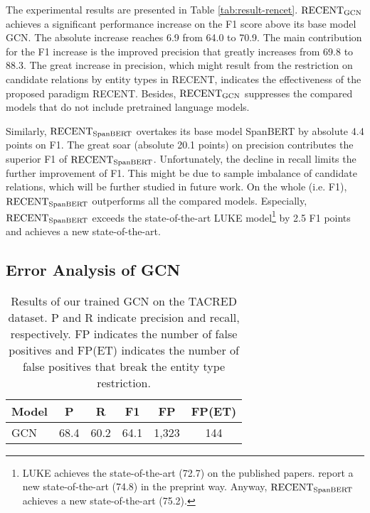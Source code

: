 \documentclass[11pt,a4paper]{article}
\begin{document}
The experimental results are presented in Table \ref{tab:result-rencet}. 
$\text{RECENT}_{\rm GCN}$ achieves a significant performance increase on the F1 score above its base model GCN. 
The absolute increase reaches  6.9 from 64.0 to 70.9. 
The main contribution for the F1 increase is the improved precision  that greatly increases from 69.8 to 88.3.
The great increase in precision, which might result from the restriction on candidate relations by entity types in RECENT, indicates the effectiveness of the proposed paradigm RECENT. 
Besides, $\text{RECENT}_{\rm GCN}$ suppresses the compared models that do not include pretrained language models. 

Similarly, $\text{RECENT}_{\rm SpanBERT}$ overtakes its base model SpanBERT by absolute 4.4 points on F1.
The great soar (absolute 20.1 points) on precision contributes the superior F1 of $\text{RECENT}_{\rm SpanBERT}$. 
Unfortunately, 
the decline in recall limits the further improvement of F1.  
This might be due to sample imbalance  of candidate relations, 
which will be further studied in future work. 
On the whole (i.e. F1), $\text{RECENT}_{\rm SpanBERT}$ outperforms all the compared models. 
Especially, $\text{RECENT}_{\rm SpanBERT}$ exceeds the state-of-the-art LUKE 
model\footnote{LUKE achieves the state-of-the-art (72.7) on the published papers. 
	\citet{cohen-etal-2020-relation} report a new state-of-the-art (74.8) in the preprint way. 
	Anyway, $\text{RECENT}_{\rm SpanBERT}$ achieves a new state-of-the-art (75.2). 
} 
by 2.5 F1 points 
and achieves a new state-of-the-art.

\subsection{Error Analysis of GCN}

\begin{table}[t]
	\centering

		\begin{tabular}{lccc|cc}		
			\toprule
			{Model} & {P} & {R} & {F1} & {FP} & {FP(ET)}   \\ 
			\midrule
			GCN  & 68.4 & 60.2 & 64.1 & 1,323 & 144  \\
			\bottomrule
		\end{tabular}
	\caption{\label{tab:result-gcn} Results of our trained GCN on the TACRED dataset. 
		P and R indicate precision and recall, respectively. 
		FP indicates the number of  false positives 
		and FP(ET) indicates the number of false positives that break the entity type restriction. 
	}
\end{table}
\end{document}
